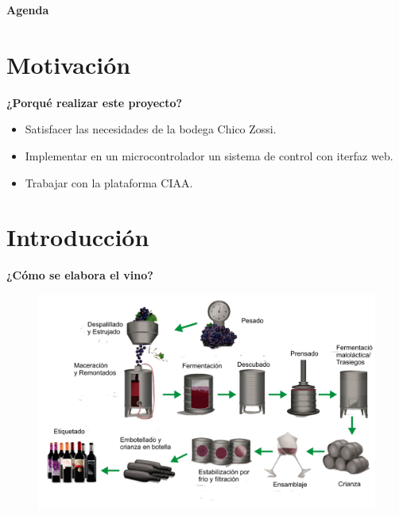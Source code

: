 \documentclass[11pt]{beamer}
\begin{document}
\begin{frame}{\textbf{\LARGE{Agenda}}}
  \fontsize{18pt}{18}\selectfont
  \tableofcontents
\end{frame}

\section{Motivación}
\begin{frame}{\textbf{\LARGE{¿Porqué realizar este proyecto?}}}
  \fontsize{18pt}{18}\selectfont
  \vspace{-30px}
  \begin{itemize}
    \item Satisfacer las necesidades de la bodega Chico Zossi.
      \vspace{5px}
    \item Implementar en un microcontrolador un sistema de control con iterfaz web.
      \vspace{5px}
    \item Trabajar con la plataforma CIAA.
  \end{itemize}
\end{frame}

\section{Introducción}

\begin{frame}{\textbf{\LARGE{¿Cómo se elabora el vino?}}}
  \fontsize{18pt}{18}\selectfont
  \hspace{-40px}
  \vspace{-30px}
  \begin{figure}[H]
    \includegraphics[width=1\textwidth]{./imagenes/elaboracion-del-vino-tinto.png}
  \end{figure}	  	  	
\end{frame}
\end{document}
